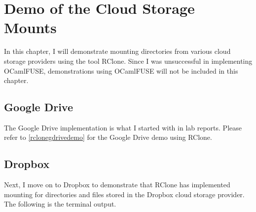 \chapter{Demo of the Cloud Storage Mounts}
\label{demos}
In this chapter, I will demonstrate mounting directories from various cloud storage providers using the tool RClone. Since I was unsuccessful in implementing OCamlFUSE, demonstrations using OCamlFUSE will not be included in this chapter.
\section{Google Drive}
The Google Drive implementation is what I started with in lab reports. Please refer to \ref{rclonegdrivedemo} for the Google Drive demo using RClone.
\section{Dropbox}
Next, I move on to Dropbox to demonstrate that RClone has implemented mounting for directories and files stored in the Dropbox cloud storage provider. The following is the terminal output.\\
